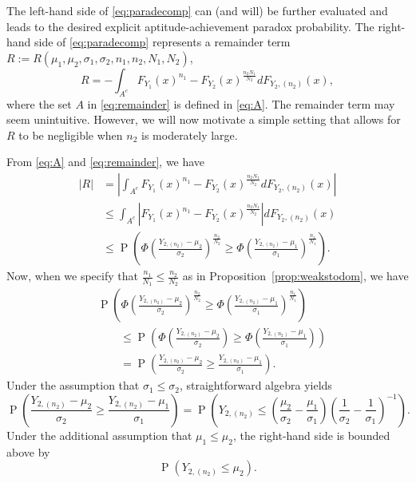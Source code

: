 \documentclass[12pt]{article}
\DeclareMathOperator*{\Prob}{P}
\begin{document}
The left-hand side of \eqref{eq:paradecomp} can (and will) be further evaluated and leads to the desired explicit aptitude-achievement paradox probability. The right-hand side of \eqref{eq:paradecomp} represents a remainder term $R := R(\mu_1,\mu_2,\sigma_1,\sigma_2, n_1,n_2,N_1,N_2)$,
\begin{equation} \label{eq:remainder}
  R = -\int_{A^c} F_{Y_1}(x)^{n_1} - F_{Y_2}(x)^{\frac{n_2N_1}{N_2}}d F_{Y_2, (n_2)}(x),
\end{equation}
where the set $A$ in \eqref{eq:remainder} is defined in \eqref{eq:A}. The remainder term may seem unintuitive. However, we will now motivate a simple setting that allows for $R$ to be negligible when $n_2$ is moderately large. 

From \eqref{eq:A} and \eqref{eq:remainder}, we have
\begin{align*}
  |R| &= \left|\int_{A^c} F_{Y_1}(x)^{n_1} - F_{Y_2}(x)^{\frac{n_2N_1}{N_2}}d F_{Y_2, (n_2)}(x)\right|\\
  &\leq \int_{A^c} \left|F_{Y_1}(x)^{n_1} - F_{Y_2}(x)^{\frac{n_2N_1}{N_2}}\right|d F_{Y_2, (n_2)}(x) \\
    &\leq \Prob\left(\Phi\left(\frac{Y_{2,(n_2)}-\mu_2}{\sigma_2}\right)^{\frac{n_2}{N_2}} \geq \Phi\left(\frac{Y_{2,(n_2)} - \mu_1}{\sigma_1}\right)^{\frac{n_1}{N_1}}\right).
\end{align*}
Now, when we specify that $\frac{n_1}{N_1} \leq \frac{n_2}{N_2}$ as in Proposition~\ref{prop:weakstodom}, we have 
\begin{align*}
    &\Prob\left(\Phi\left(\frac{Y_{2,(n_2)}-\mu_2}{\sigma_2}\right)^{\frac{n_2}{N_2}} \geq \Phi\left(\frac{Y_{2,(n_2)} - \mu_1}{\sigma_1}\right)^{\frac{n_1}{N_1}}\right) \\
    &\qquad \leq 
    \Prob\left(\Phi\left(\frac{Y_{2,(n_2)}-\mu_2}{\sigma_2}\right) \geq \Phi\left(\frac{Y_{2,(n_2)} - \mu_1}{\sigma_1}\right)\right)	 \\	
    &\qquad = \Prob\left(\frac{Y_{2,(n_2)}-\mu_2}{\sigma_2} \geq \frac{Y_{2,(n_2)} - \mu_1}{\sigma_1}\right).
\end{align*}
Under the assumption that $\sigma_1 \leq \sigma_2$, straightforward algebra yields
$$
  \Prob\left(\frac{Y_{2,(n_2)}-\mu_2}{\sigma_2} \geq \frac{Y_{2,(n_2)} - \mu_1}{\sigma_1}\right)
  = \Prob\left(Y_{2,(n_2)} \leq \left(\frac{\mu_2}{\sigma_2} - \frac{\mu_1}{\sigma_1}\right)\left(\frac{1}{\sigma_2} - \frac{1}{\sigma_1}\right)^{-1}\right).
$$
Under the additional assumption that $\mu_1 \leq \mu_2$, the right-hand side is bounded above by
$$
  \Prob\left(Y_{2,(n_2)} \leq \mu_2\right).
$$
\end{document}
